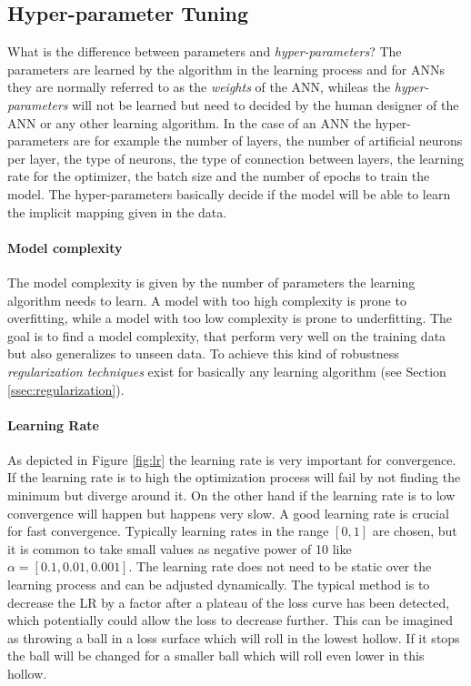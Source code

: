 \subsection{Hyper-parameter Tuning}\label{ssec:hyperP}
What is the difference between parameters and \emph{hyper-parameters}?
The parameters are learned by the algorithm in the learning process and for ANNs they are normally referred to as the \emph{weights} of the ANN, whileas the \emph{hyper-parameters} will not be learned but need to decided by the human designer of the ANN or any other learning algorithm.
In the case of an ANN the hyper-parameters are for example the number of layers, the number of artificial neurons per layer, the type of neurons, the type of connection between layers, the learning rate for the optimizer, the batch size and the number of epochs to train the model.
The hyper-parameters basically decide if the model will be able to learn the implicit mapping given in the data.
\paragraph{Model complexity}
The model complexity is given by the number of parameters the learning algorithm needs to learn.
A model with too high complexity is prone to overfitting, while a model with too low complexity is prone to underfitting.
The goal is to find a model complexity, that perform very well on the training data but also generalizes to unseen data.
To achieve this kind of robustness \emph{regularization techniques} exist for basically any learning algorithm (see Section \ref{ssec:regularization}). 
\paragraph{Learning Rate}
As depicted in Figure \ref{fig:lr} the learning rate is very important for convergence. 
If the learning rate is to high the optimization process will fail by not finding the minimum but diverge around it.
On the other hand if the learning rate is to low convergence will happen but happens very slow. 
A good learning rate is crucial for fast convergence.
Typically learning rates in the range $[0, 1]$ are chosen, but it is common to take small values as negative power of 10 like $\alpha = [0.1, 0.01, 0.001]$.
The learning rate does not need to be static over the learning process and can be adjusted dynamically.
The typical
method is to decrease the LR by a factor after a plateau of the loss
curve has been detected, which potentially could allow the loss
to decrease further. \cite{ValdenegroToro2019DeepNN}
This can be imagined as throwing a ball in a loss surface which will roll in the lowest hollow. If it stops the ball will be changed for a smaller ball which will roll even lower in this hollow.
